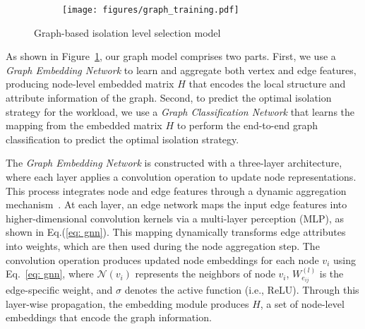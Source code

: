 \begin{figure}[t]
    \centering
    \begin{minipage}{0.99\linewidth}
        \centering
        \begin{subfigure}{1.0\linewidth}
            \texttt{[image: figures/graph\_training.pdf]}
        \end{subfigure}
    \end{minipage}
    \vspace{-2mm}
    \caption{Graph-based isolation level selection model}
    \label{fig:graph_learning}
    \vspace{-6mm}
\end{figure}

As shown in Figure~\ref{fig:graph_learning}, our graph model comprises two parts. First, we use a \textit{Graph Embedding Network} to learn and aggregate both vertex and edge features, producing node-level embedded matrix $H$ that encodes the local structure and attribute information of the graph. Second, to predict the optimal isolation strategy for the workload, we use a \textit{Graph Classification Network} that learns the mapping from the embedded matrix $H$ to perform the end-to-end graph classification to predict the optimal isolation strategy.

The \textit{Graph Embedding Network} is constructed with a three-layer architecture, where each layer applies a convolution operation to update node representations. This process integrates node and edge features through a dynamic aggregation mechanism~\cite{DBLP:journals/pvldb/ZhouSLF20,DBLP:conf/pkdd/FurutaniSAHA19}. At each layer, an edge network maps the input edge features into higher-dimensional convolution kernels via a multi-layer perception (MLP), as shown in Eq.(\ref{eq: gnn}). This mapping dynamically transforms edge attributes into weights, which are then used during the node aggregation step. The convolution operation produces updated node embeddings for each node $v_i$ using Eq.~\ref{eq: gnn}, where $\mathcal{N}(v_i)$ represents the neighbors of node $v_i$, $W^{(l)}_{e_{ij}}$ is the edge-specific weight, and $\sigma$ denotes the active function (i.e., ReLU). Through this layer-wise propagation, the embedding module produces $H$, a set of node-level embeddings that encode the graph information.

